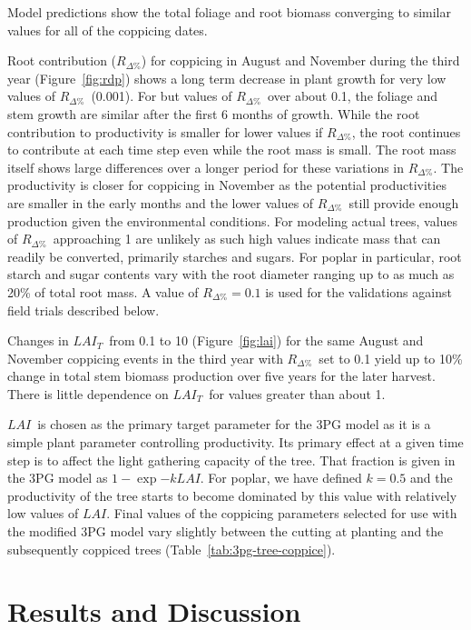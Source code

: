 \documentclass[10pt]{article}
\newcommand{\LAIt}{\ensuremath{LAI_{T}}}
\newcommand{\LAI}{\ensuremath{LAI}}
\newcommand{\Rdp}{\ensuremath{R_{\Delta\%}}}
\begin{document}
Model predictions show the total foliage and root biomass converging to similar
values for all of the coppicing dates.

Root contribution (\Rdp) for coppicing in August and November during the third
year (Figure~\ref{fig:rdp}) shows a long term decrease in plant growth for very
low values of \Rdp~(0.001).  For but values of \Rdp~over about 0.1, the foliage
and stem growth are similar after the first 6 months of growth. While the root
contribution to productivity is smaller for lower values if \Rdp, the root
continues to contribute at each time step even while the root mass is small. The
root mass itself shows large differences over a longer period for these
variations in \Rdp. The productivity is closer for coppicing in November as the
potential productivities are smaller in the early months and the lower values of
\Rdp~still provide enough production given the environmental conditions. For
modeling actual trees, values of \Rdp~approaching 1 are unlikely as such high
values indicate mass that can readily be converted, primarily starches and
sugars. For poplar in particular, root starch and sugar contents vary with the
root diameter ranging up to as much as 20\% of total root mass. A value of
$\Rdp=0.1$ is used for the validations against field trials described below.

Changes in \LAIt~from 0.1 to 10 (Figure~\ref{fig:lai}) for the same August and
November coppicing events in the third year with \Rdp~set to 0.1 yield up to
10\% change in total stem biomass production over five years for the later
harvest. There is little dependence on \LAIt~for values greater than about 1.

\LAI~is chosen as the primary target parameter for the 3PG model as it is a
simple plant parameter controlling productivity. Its primary effect at a given
time step is to affect the light gathering capacity of the tree. That fraction
is given in the 3PG model as $1−\exp{-k LAI}$. For poplar, we have defined $k =
0.5$ and the productivity of the tree starts to become dominated by this value
with relatively low values of \LAI.  Final values of the coppicing parameters
selected for use with the modified 3PG model vary slightly between the cutting
at planting and the subsequently coppiced trees
(Table~\ref{tab:3pg-tree-coppice}).

\section*{Results and Discussion}
\label{sec:validation}
\end{document}
